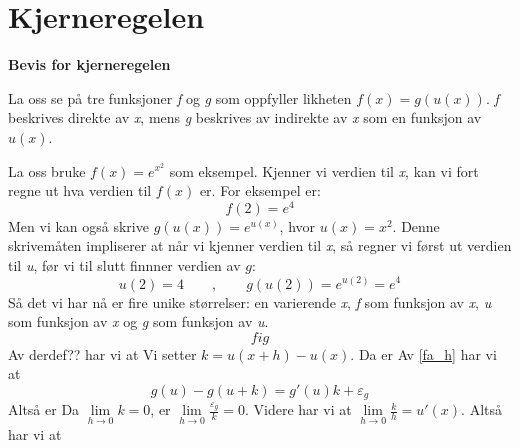 \section{Kjerneregelen}
\textbf{Bevis for kjerneregelen}

La oss se på tre funksjoner \textit{f} og \textit{g} som oppfyller likheten $f(x)= g(u(x)) $. \textit{f} beskrives direkte av \textit{x}, mens \textit{g} beskrives av indirekte av \textit{x} som en funksjon av $ u(x) $. \vsk

La oss bruke $f(x) =e^{x^2} $ som eksempel. Kjenner vi verdien til \textit{x}, kan vi fort regne ut hva verdien til $ f(x) $ er. For eksempel er: 
\[ f(2)=e^4 \]
Men vi kan også skrive $ g(u(x))=e^{u(x)} $, hvor $ u(x)=x^2 $. Denne skrivemåten impliserer at når vi kjenner verdien til \textit{x}, så regner vi først ut verdien til \textit{u}, før vi til slutt finnner verdien av $g$: 
\[ u(2) =4\qquad,\qquad 
g(u(2))=e^{u(2)}=e^4 \]
Så det vi har nå er fire unike størrelser: en varierende \textit{x}, \textit{f} som funksjon av \textit{x}, \textit{u} som funksjon av \textit{x} og \textit{g} som funksjon av \textit{u}.
\[ fig \]
Av derdef?? har vi at
Vi setter $ k = u(x+h)-u(x) $. Da er
Av \eqref{fa_h} har vi at
\[ g(u)-g(u+k)= g'(u)k+\varepsilon_g  \]
Altså er
Da $ \lim\limits_{h\to0}k=0 $, er $ \lim\limits_{h\to0}\frac{\varepsilon_g}{k}=0 $. Videre har vi at $ \lim\limits_{h\to0}\frac{k}{h}=u'(x) $. Altså har vi at
\vspace{11 pt}

